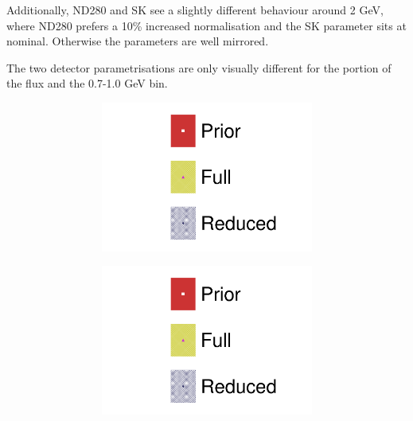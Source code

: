 Additionally, ND280 and SK see a slightly different behaviour around 2 GeV, where ND280 prefers a 10\% increased normalisation and the SK parameter sits at nominal. Otherwise the parameters are well mirrored.

The two detector parametrisations are only visually different for the \nuebar portion of the flux and the 0.7-1.0 GeV \numubar bin.
\begin{figure}[h]
	\centering
		\begin{subfigure}[t]{\textwidth}
	\begin{subfigure}[t]{0.24\textwidth}
		\includegraphics[width=\textwidth,page=6, trim={0mm 0mm 0mm 9mm}, clip]{figures/mach3/2018/data/2018a_FixedCov_FullCov_Mpi_Data_merg_2018a_FixedCov_RedCov_Mpi_Data_merge}
	\end{subfigure}
	\begin{subfigure}[t]{0.24\textwidth}
		\includegraphics[width=\textwidth,page=7, trim={0mm 0mm 0mm 9mm}, clip]{figures/mach3/2018/data/2018a_FixedCov_FullCov_Mpi_Data_merg_2018a_FixedCov_RedCov_Mpi_Data_merge}

\end{subfigure}
\end{subfigure}
\end{figure}
